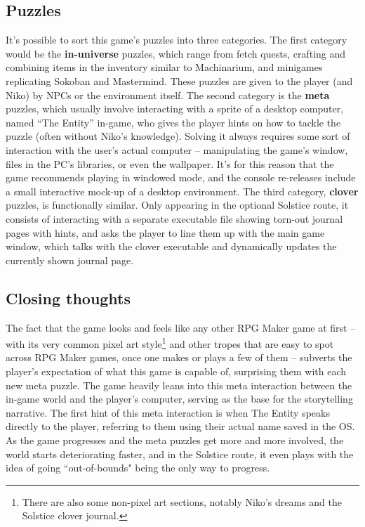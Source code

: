 \documentclass[a4paper,10pt,english]{article}
\begin{document}
\subsection*{Puzzles}

It's possible to sort this game's puzzles into three categories. The first category would be the \textbf{in-universe} puzzles, which range from fetch quests, crafting and combining items in the inventory similar to Machinarium, and minigames replicating Sokoban and Mastermind. These puzzles are given to the player (and Niko) by NPCs or the environment itself. The second category is the \textbf{meta} puzzles, which usually involve interacting with a sprite of a desktop computer, named ``The Entity'' in-game, who gives the player hints on how to tackle the puzzle (often without Niko's knowledge). Solving it always requires some sort of interaction with the user's actual computer -- manipulating the game's window, files in the PC's libraries, or even the wallpaper. It's for this reason that the game recommends playing in windowed mode, and the console re-releases include a small interactive mock-up of a desktop environment. The third category, \textbf{clover} puzzles, is functionally similar. Only appearing in the optional Solstice route, it consists of interacting with a separate executable file showing torn-out journal pages with hints, and asks the player to line them up with the main game window, which talks with the clover executable and dynamically updates the currently shown journal page.

\subsection*{Closing thoughts}

The fact that the game looks and feels like any other RPG Maker game at first -- with its very common pixel art style\footnote{There are also some non-pixel art sections, notably Niko's dreams and the Solstice clover journal.} and other tropes that are easy to spot across RPG Maker games, once one makes or plays a few of them -- subverts the player's expectation of what this game is capable of, surprising them with each new meta puzzle. The game heavily leans into this meta interaction between the in-game world and the player's computer, serving as the base for the storytelling narrative. The first hint of this meta interaction is when The Entity speaks directly to the player, referring to them using their actual name saved in the OS. As the game progresses and the meta puzzles get more and more involved, the world starts deteriorating faster, and in the Solstice route, it even plays with the idea of going ``out-of-bounds" being the only way to progress.
\end{document}
